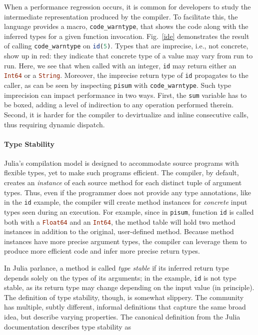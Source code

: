 \documentclass[oneside,openright,titlepage,numbers=noenddot,%
headinclude,footinclude,cleardoublepage=empty,abstract=on,
BCOR=5mm,paper=a4,fontsize=11pt,
dvipsnames
]{scrreprt}
\renewcommand{\c}[1]{\lstinline[language=Julia]!#1!\xspace}
\begin{document}
When a performance regression occurs, it is common for developers to study the
intermediate representation produced by the compiler. To facilitate this, the
language provides a macro, \c{code_warntype}, that shows the code along with the
inferred types for a given function invocation. Fig.~\ref{ide} demonstrates the result of
calling \c{code_warntype} on \c{id(5)}. Types that are imprecise, i.e., not
concrete, show up in red: they indicate that concrete type of a value may vary
from run to run. Here, we see that when called with an integer,
\c{id} may return either an
\c{Int64} or a \c{String}.
Moreover, the imprecise return type of \c{id} propagates to the caller,
as can be seen by inspecting \c{pisum} with \c{code_warntype}.
%
Such type imprecision can impact performance in two ways. First,
the \c{sum} variable has to be boxed, adding a level of indirection to
any operation performed therein. Second, it is harder for
the compiler to devirtualize and inline consecutive calls, thus requiring
dynamic dispatch.

\paragraph{Type Stability}
Julia's compilation model is designed to accommodate source programs
with flexible types, yet to make such programs efficient. The compiler, by
default, creates an \emph{instance} of each source method for each distinct tuple of
argument types. Thus, even if the programmer does not provide any type
annotations, like in the \c{id} example, the compiler will create method
instances for \emph{concrete} input types seen during
an execution. For example, since in \c{pisum}, function \c{id} is called both
with a \c{Float64} and an \c{Int64}, the method table will hold two method instances
in addition to the original, user-defined method.
Because method instances have more precise argument types, the compiler can
leverage them to produce more efficient code and infer more precise return types.

In Julia parlance, a method is called \emph{type stable} if its inferred
return type depends solely on the types of its arguments; in the
example, \c{id} is not type stable, as its return type may change depending on
the input value (in principle). The definition of type stability, though, is somewhat slippery.
The community has multiple, subtly different, informal definitions that capture
the same broad idea, but describe varying properties. The canonical definition
from the Julia documentation describes type stability as
\end{document}
